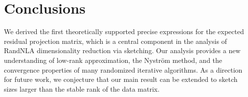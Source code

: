 \documentclass[../../thesis.tex]{subfiles}
\begin{document}
\section{Conclusions}

We derived the first theoretically supported precise expressions for the
expected residual projection matrix, which is a central component in
the analysis of RandNLA dimensionality reduction via sketching. Our
analysis provides a new understanding of low-rank approximation, the Nystr\"om method, and the
convergence properties of many randomized iterative algorithms. As a direction for future work, we conjecture that our
main result can be extended to sketch sizes larger than the stable
rank of the data matrix.





% 
% 



\end{document}
